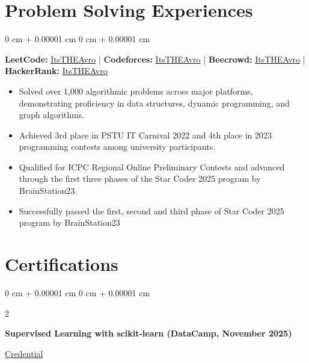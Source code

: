 \documentclass[10pt, letterpaper]{article}
\newenvironment{highlights}{
    \begin{itemize}[
        topsep=0.10 cm,
        parsep=0.10 cm,
        partopsep=0pt,
        itemsep=0pt,
        leftmargin=0 cm + 10pt
    ]
}{
    \end{itemize}
} %
\newenvironment{onecolentry}{
    \begin{adjustwidth}{
        0 cm + 0.00001 cm
    }{
        0 cm + 0.00001 cm
    }
}{
    \end{adjustwidth}
} %
\newenvironment{twocolentry}[2][]{
    \onecolentry
    \def\secondColumn{#2}
    \setcolumnwidth{\fill, 4.5 cm}
    \begin{paracol}{2}
}{
    \switchcolumn \raggedleft \secondColumn
    \end{paracol}
    \endonecolentry
} %
\begin{document}
 \section{Problem Solving Experiences}
        
        \begin{onecolentry}
    
           \begin{center}
            \textbf{LeetCode: }\href{https://leetcode.com/u/ItsTHEAvro/}{ItsTHEAvro}
            |
            \textbf{Codeforces: }\href{https://codeforces.com/profile/ItsTHEAvro/}{ItsTHEAvro}
            |
            \textbf{Beecrowd: }\href{https://judge.beecrowd.com/en/profile/260423}{ItsTHEAvro}
            |
            \textbf{HackerRank: }\href{https://www.hackerrank.com/profile/ItsTHEAvro}{ItsTHEAvro} 
           \end{center}
           \vspace{0.1 cm}

           \begin{highlights}
\item Solved over 1,000 algorithmic problems across major platforms, demonstrating proficiency in data structures, dynamic programming, and graph algorithms.
\item Achieved 3rd place in PSTU IT Carnival 2022 and 4th place in 2023 programming contests among university participants.
\item Qualified for ICPC Regional Online Preliminary Contests and advanced through the first three phases of the Star Coder 2025 program by BrainStation23.

                \item Successfully passed the first, second and third phase of Star Coder 2025 program by BrainStation23
            \end{highlights}

        \end{onecolentry}
 \section{Certifications}

\begin{twocolentry}
    {\href{https://www.datacamp.com/completed/statement-of-accomplishment/course/3bf58271a0af0c86c9d22491430902a9066b0fff}{Credential}}
    \textbf{Supervised Learning with scikit-learn (DataCamp, November 2025)}
\end{twocolentry}
\vspace{0.10 cm}
\end{document}
